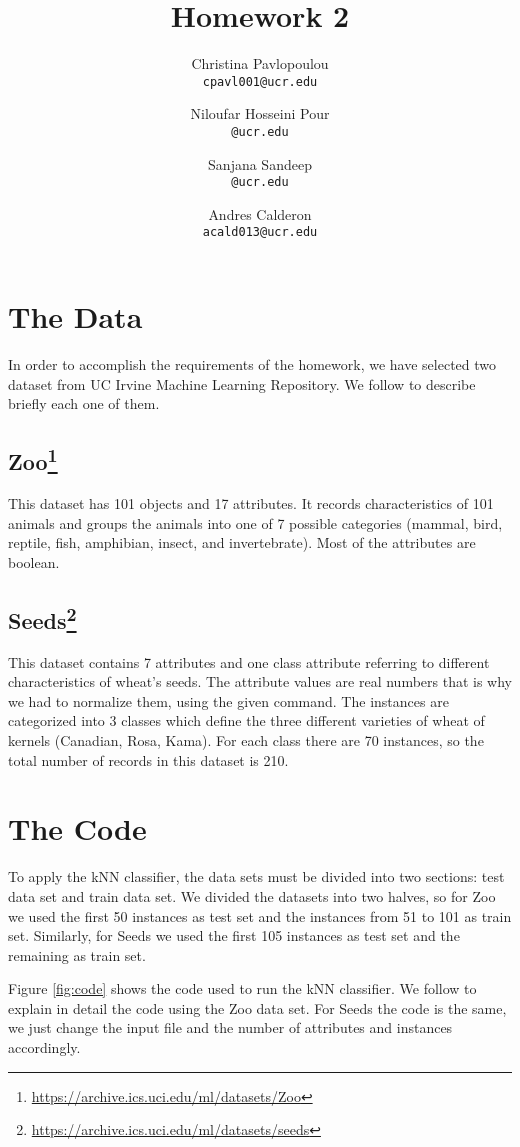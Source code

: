 \documentclass[10pt]{scrartcl}
\title{Homework 2}
\author{
   Christina Pavlopoulou\\
  \small \texttt{cpavl001@ucr.edu}
  \and
   Niloufar Hosseini Pour\\
  \small \texttt{@ucr.edu}
  \and
   Sanjana Sandeep \\
  \small \texttt{@ucr.edu}
  \and
   Andres Calderon\\
  \small \texttt{acald013@ucr.edu}
}
\begin{document}
\tiny
\maketitle
\normalsize

\section{The Data}
In order to accomplish the requirements of the homework, we have selected two dataset from UC Irvine Machine Learning Repository\cite{repo}.  We follow to describe briefly each one of them.

\subsection[Zoo]{Zoo\footnote{\url{https://archive.ics.uci.edu/ml/datasets/Zoo}}}
This dataset has 101 objects and 17 attributes. It records characteristics of 101 animals and groups the animals into one of 7 possible categories (mammal, bird, reptile, fish,
amphibian, insect, and invertebrate). Most of the attributes are boolean.

\subsection[Seeds]{Seeds\footnote{\url{https://archive.ics.uci.edu/ml/datasets/seeds}}}
This dataset contains 7 attributes and one class attribute referring to different characteristics of wheat's seeds.  The attribute values are real numbers that is why we had to normalize them, using the given command. The instances are categorized into 3 classes which define the three different varieties of wheat of kernels (Canadian, Rosa, Kama). For each class there are 70 instances, so the total number of records in this dataset is 210.

\section{The Code}
To apply the kNN classifier, the data sets must be divided into two sections: test data set and train data set.  We divided the datasets into two halves, so for Zoo we used the first 50 instances as test set and the instances from 51 to 101 as train set.  Similarly, for Seeds we used the first 105 instances as test set and the remaining as train set.  

Figure \ref{fig:code} shows the code used to run the kNN classifier.  We follow to explain in detail the code using the Zoo data set.  For Seeds the code is the same, we just change the input file and the number of attributes and instances accordingly.
\end{document}
